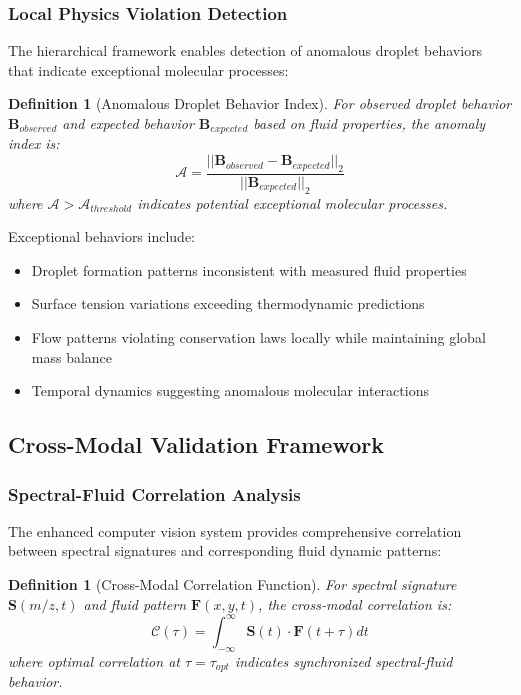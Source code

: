 \documentclass[11pt,a4paper]{article}
\newtheorem{definition}[theorem]{Definition}
\theoremstyle{remark}
\begin{document}
\subsubsection{Local Physics Violation Detection}

The hierarchical framework enables detection of anomalous droplet behaviors that indicate exceptional molecular processes:

\begin{definition}[Anomalous Droplet Behavior Index]
For observed droplet behavior $\mathbf{B}_{observed}$ and expected behavior $\mathbf{B}_{expected}$ based on fluid properties, the anomaly index is:
\begin{equation}
\mathcal{A} = \frac{||\mathbf{B}_{observed} - \mathbf{B}_{expected}||_2}{||\mathbf{B}_{expected}||_2}
\end{equation}
where $\mathcal{A} > \mathcal{A}_{threshold}$ indicates potential exceptional molecular processes.
\end{definition}

Exceptional behaviors include:
\begin{itemize}
\item Droplet formation patterns inconsistent with measured fluid properties
\item Surface tension variations exceeding thermodynamic predictions
\item Flow patterns violating conservation laws locally while maintaining global mass balance
\item Temporal dynamics suggesting anomalous molecular interactions
\end{itemize}

\subsection{Cross-Modal Validation Framework}

\subsubsection{Spectral-Fluid Correlation Analysis}

The enhanced computer vision system provides comprehensive correlation between spectral signatures and corresponding fluid dynamic patterns:

\begin{definition}[Cross-Modal Correlation Function]
For spectral signature $\mathbf{S}(m/z, t)$ and fluid pattern $\mathbf{F}(x, y, t)$, the cross-modal correlation is:
\begin{equation}
\mathcal{C}(\tau) = \int_{-\infty}^{\infty} \mathbf{S}(t) \cdot \mathbf{F}(t + \tau) dt
\end{equation}
where optimal correlation at $\tau = \tau_{opt}$ indicates synchronized spectral-fluid behavior.
\end{definition}
\end{document}
